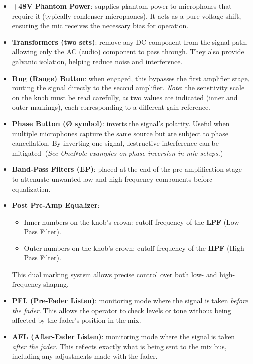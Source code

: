 \begin{itemize}
    \item \textbf{+48V Phantom Power}: supplies phantom power to microphones that require it (typically condenser microphones).  
    It acts as a pure voltage shift, ensuring the mic receives the necessary bias for operation.

    \item \textbf{Transformers (two sets)}: remove any DC component from the signal path, allowing only the AC (audio) component to pass through.  
    They also provide galvanic isolation, helping reduce noise and interference.

    \item \textbf{Rng (Range) Button}: when engaged, this bypasses the first amplifier stage, routing the signal directly to the second amplifier.  
    \textit{Note}: the sensitivity scale on the knob must be read carefully, as two values are indicated (inner and outer markings), each corresponding to a different gain reference.

    \item \textbf{Phase Button (Ø symbol)}: inverts the signal’s polarity.  
    Useful when multiple microphones capture the same source but are subject to phase cancellation. By inverting one signal, destructive interference can be mitigated.  
    (\textit{See OneNote examples on phase inversion in mic setups.})

    \item \textbf{Band-Pass Filters (BP)}: placed at the end of the pre-amplification stage to attenuate unwanted low and high frequency components before equalization.

    \item \textbf{Post Pre-Amp Equalizer}:  
    \begin{itemize}
        \item Inner numbers on the knob’s crown: cutoff frequency of the \textbf{LPF} (Low-Pass Filter).
        \item Outer numbers on the knob’s crown: cutoff frequency of the \textbf{HPF} (High-Pass Filter).
    \end{itemize}
    This dual marking system allows precise control over both low- and high-frequency shaping.

    \item \textbf{PFL (Pre-Fader Listen)}: monitoring mode where the signal is taken \textit{before the fader}.  
    This allows the operator to check levels or tone without being affected by the fader’s position in the mix.

    \item \textbf{AFL (After-Fader Listen)}: monitoring mode where the signal is taken \textit{after the fader}.  
    This reflects exactly what is being sent to the mix bus, including any adjustments made with the fader.
\end{itemize}


